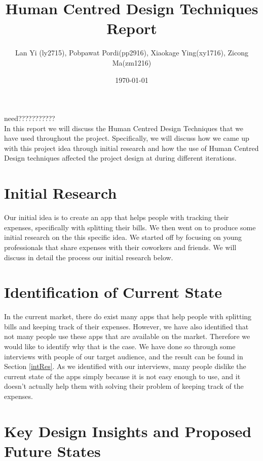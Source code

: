 \documentclass[a4wide, 11pt]{article}
\begin{document}
\title{Human Centred Design Techniques Report}

\author{Lan Yi (ly2715), Pobpawat Pordi(pp2916), Xiaokage Ying(xy1716), Zicong Ma(zm1216)}

\date{\today}         %

\maketitle            %

\abstract
need???????????
\\In this report we will discuss the Human Centred Design Techniques that we have used throughout the project. Specifically, we will discuss how we came up with this project idea through initial research and how the use of Human Centred Design techniques affected the project design at during different iterations. 

\section{Initial Research} 


Our initial idea is to create an app that helps people with tracking their expenses, specifically with splitting their bills. We then went on to produce some initial research on the this specific idea. We started off by focusing on young professionals that share expenses with their coworkers and friends. We will discuss in detail the process our initial research below.

\section{Identification of Current State}

In the current market, there do exist many apps that help people with splitting bills and keeping track of their expenses. However, we have also identified that not many people use these apps that are available on the market. Therefore we would like to identify why that is the case. We have done so through some interviews with people of our target audience, and the result can be found in Section \ref{intRes}. As we identified with our interviews, many people dislike the current state of the apps simply because it is not easy enough to use, and it doesn't actually help them with solving their problem of keeping track of the expenses.

\section{Key Design Insights and Proposed Future States}
\end{document}
